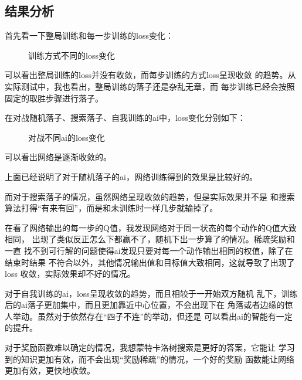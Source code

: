 \documentclass[UTF8]{article}
\begin{document}
\subsection{结果分析}

首先看一下整局训练和每一步训练的loss变化：
\nopagebreak

\begin{figure}[H]
    \centering
    \caption{训练方式不同的loss变化}
\end{figure}

可以看出整局训练的loss并没有收敛，而每步训练的方式loss呈现收敛
的趋势。从实际测试中，我也看出，整局训练的落子还是杂乱无章，而
每步训练已经会按照固定的取胜步骤进行落子。


在对战随机落子、搜索落子、自我训练的ai中，loss变化分别如下：
\nopagebreak

\begin{figure}[H]
    \centering
    \caption{对战不同ai的loss变化}
\end{figure}

可以看出网络是逐渐收敛的。

上面已经说明了对于随机落子的ai，网络训练得到的效果是比较好的。

而对于搜索落子的情况，虽然网络呈现收敛的趋势，但是实际效果并不是
和搜索算法打得“有来有回”，而是和未训练时一样几步就输掉了。

在看了网络输出的每一步的Q值，我发现网络对于同一状态的每个动作的Q值大致相同，
出现了类似反正怎么下都赢不了，随机下出一步算了的情况。稀疏奖励和一直
找不到可行解的问题使得ai发现只要对每一个动作输出相同的权值，除了在结束时结果
不符合以外，其他情况输出值和目标值大致相同，这就导致了出现了loss
收敛，实际效果却不好的情况。

对于自我训练的ai，loss呈现收敛的趋势，而且相较于一开始双方随机
乱下，训练后的ai落子更加集中，而且更加靠近中心位置，不会出现下在
角落或者边缘的惊人举动。虽然对于依然存在“四子不连”的举动，但还是
可以看出ai的智能有一定的提升。

对于奖励函数难以确定的情况，我想蒙特卡洛树搜索是更好的答案，它能让
学习到的知识更加有效，而不会出现“奖励稀疏”的情况，一个好的奖励
函数能让网络更加有效，更快地收敛。
\end{document}
